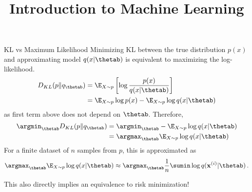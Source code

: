 \documentclass[11pt,compress,t,notes=noshow, xcolor=table]{beamer}
\title{Introduction to Machine Learning}
\begin{document}
    

\begin{vbframe}{KL vs Maximum Likelihood}
Minimizing KL between the true distribution $p(x)$ and approximating model $q(x|\thetab)$ is equivalent to maximizing the log-likelihood.
  \begin{align*}
    D_{KL}(p \| q_{\thetab}) &= \E_{X \sim p} \left[ \log \frac{p(x)}{q(x|\thetab)}\right] \\
     &= \E_{X \sim p} \log p(x) - \E_{X \sim p} \log q(x|\thetab)
  \end{align*}
  as first term above does not depend on $\thetab$.
  Therefore,
  \begin{align*}
    \argmin_{\thetab} D_{KL}(p \| q_{\thetab}) &= \argmin_{\thetab} -\E_{X \sim p} \log q(x|\thetab)\\ 
                                           &= \argmax_{\thetab} \E_{X \sim p} \log q(x|\thetab)
  \end{align*}
  For a finite dataset of $n$ samples from $p$, this is approximated as 
  $$\argmax_{\thetab} \E_{X \sim p} \log q(x|\thetab) \approx \argmax_{\thetab} \frac{1}{n} \sumin \log q(\xi|\thetab)\,.$$

  This also directly implies an equivalence to risk minimization!

\end{vbframe}
\end{document}
